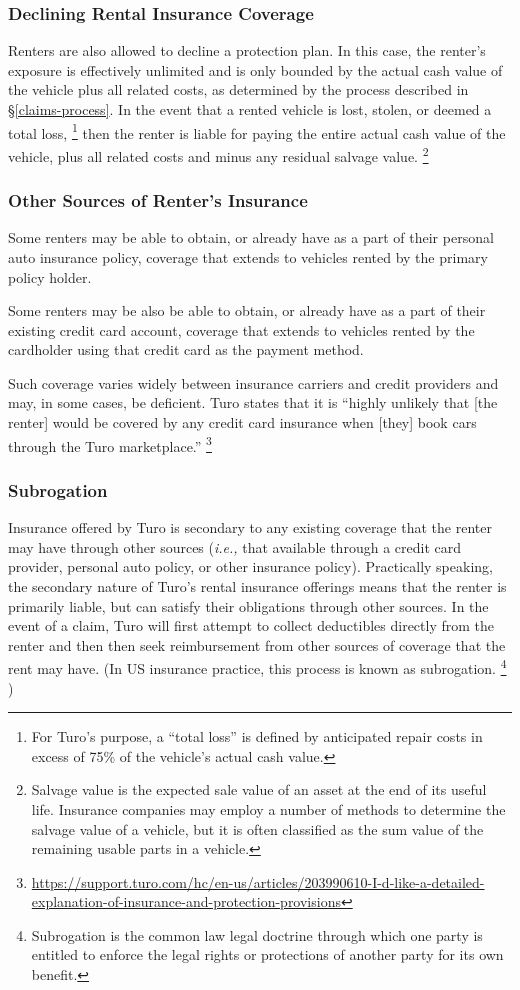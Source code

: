 \documentclass[review,12pt]{elsarticle}
\begin{document}
\subsubsection{Declining Rental Insurance Coverage}\label{commercial-insurance}
Renters are also allowed to decline a protection plan. In this case, the renter's exposure is effectively unlimited and is only bounded by the actual cash value of the vehicle plus all related costs, as determined by the process described in \S\ref{claims-process}. In the event that a rented vehicle is lost, stolen, or deemed a total loss,
\footnote{For Turo's purpose, a ``total loss'' is defined by anticipated repair costs in excess of 75\% of the vehicle's actual cash value.
}
then the renter is liable for paying the entire actual cash value of the vehicle, plus all related costs and minus any residual salvage value.
\footnote{Salvage value is the expected sale value of an asset at the end of its useful life. Insurance companies may employ a number of methods to determine the salvage value of a vehicle, but it is often classified as the sum value of the remaining usable parts in a vehicle.
}

\subsubsection{Other Sources of Renter's Insurance}
Some renters may be able to obtain, or already have as a part of their personal auto insurance policy, coverage that extends to vehicles rented by the primary policy holder.

Some renters may be also be able to obtain, or already have as a part of their existing credit card account, coverage that extends to vehicles rented by the cardholder using that credit card as the payment method.

Such coverage varies widely between insurance carriers and credit providers and may, in some cases, be deficient. Turo states that it is ``highly unlikely that [the renter] would be covered by any credit card insurance when [they] book cars through the Turo marketplace.''
\footnote{\url{https://support.turo.com/hc/en-us/articles/203990610-I-d-like-a-detailed-explanation-of-insurance-and-protection-provisions}}

\subsubsection{Subrogation}
Insurance offered by Turo is secondary to any existing coverage that the renter may have through other sources (\emph{i.e.,} that available through a credit card provider, personal auto policy, or other insurance policy). Practically speaking, the secondary nature of Turo's rental insurance offerings means that the renter is primarily liable, but can satisfy their obligations through other sources. In the event of a claim, Turo will first attempt to collect deductibles directly from the renter and then then seek reimbursement from other sources of coverage that the rent may have. (In US insurance practice, this process is known as subrogation.
\footnote{Subrogation is the common law legal doctrine through which one party is entitled to enforce the legal rights or protections of another party for its own benefit.
}
)
\end{document}
